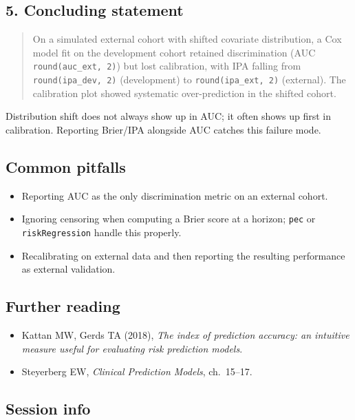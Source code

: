 \documentclass[
]{article}
\providecommand{\tightlist}{%
  \setlength{\itemsep}{0pt}\setlength{\parskip}{0pt}}
\begin{document}
\subsection{5. Concluding statement}\label{concluding-statement}

\begin{quote}
On a simulated external cohort with shifted covariate distribution, a
Cox model fit on the development cohort retained discrimination (AUC
\texttt{round(auc\_ext,\ 2)}) but lost calibration, with IPA falling
from \texttt{round(ipa\_dev,\ 2)} (development) to
\texttt{round(ipa\_ext,\ 2)} (external). The calibration plot showed
systematic over-prediction in the shifted cohort.
\end{quote}

Distribution shift does not always show up in AUC; it often shows up
first in calibration. Reporting Brier/IPA alongside AUC catches this
failure mode.

\subsection{Common pitfalls}\label{common-pitfalls}

\begin{itemize}
\tightlist
\item
  Reporting AUC as the only discrimination metric on an external cohort.
\item
  Ignoring censoring when computing a Brier score at a horizon;
  \texttt{pec} or \texttt{riskRegression} handle this properly.
\item
  Recalibrating on external data and then reporting the resulting
  performance as external validation.
\end{itemize}

\subsection{Further reading}\label{further-reading}

\begin{itemize}
\tightlist
\item
  Kattan MW, Gerds TA (2018), \emph{The index of prediction accuracy: an
  intuitive measure useful for evaluating risk prediction models}.
\item
  Steyerberg EW, \emph{Clinical Prediction Models}, ch.~15--17.
\end{itemize}

\subsection{Session info}\label{session-info}
\end{document}
